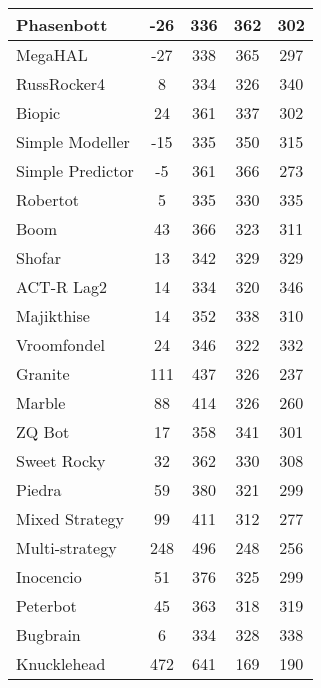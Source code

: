 \begin{table}
\begin{tabular}{|l|c|c|c|c|}
Phasenbott & -26 & 336 & 362 & 302 \\ \hline 
MegaHAL & -27 & 338 & 365 & 297 \\ \hline 
RussRocker4 & 8 & 334 & 326 & 340 \\ \hline 
Biopic & 24 & 361 & 337 & 302 \\ \hline 
Simple Modeller & -15 & 335 & 350 & 315 \\ \hline 
Simple Predictor & -5 & 361 & 366 & 273 \\ \hline 
Robertot & 5 & 335 & 330 & 335 \\ \hline 
Boom & 43 & 366 & 323 & 311 \\ \hline 
Shofar & 13 & 342 & 329 & 329 \\ \hline 
ACT-R Lag2 & 14 & 334 & 320 & 346 \\ \hline 
Majikthise & 14 & 352 & 338 & 310 \\ \hline 
Vroomfondel & 24 & 346 & 322 & 332 \\ \hline 
\rowcolor{HighlightRowColor} Granite & 111 & 437 & 326 & 237 \\ \hline 
\rowcolor{HighlightRowColor} Marble & 88 & 414 & 326 & 260 \\ \hline 
ZQ Bot & 17 & 358 & 341 & 301 \\ \hline 
Sweet Rocky & 32 & 362 & 330 & 308 \\ \hline 
\rowcolor{HighlightRowColor} Piedra & 59 & 380 & 321 & 299 \\ \hline 
\rowcolor{HighlightRowColor} Mixed Strategy & 99 & 411 & 312 & 277 \\ \hline 
\rowcolor{HighlightRowColor} Multi-strategy & 248 & 496 & 248 & 256 \\ \hline 
\rowcolor{HighlightRowColor} Inocencio & 51 & 376 & 325 & 299 \\ \hline 
Peterbot & 45 & 363 & 318 & 319 \\ \hline 
Bugbrain & 6 & 334 & 328 & 338 \\ \hline 
\rowcolor{HighlightRowColor} Knucklehead & 472 & 641 & 169 & 190 \\ \hline
        \end{tabular}
    \end{table}